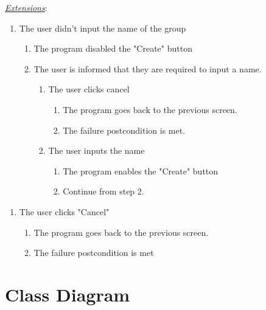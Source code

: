 \documentclass[a4paper]{article}
\begin{document}
\underline{\textit{Extensions}}:
\begin{enumerate}[label=1\alph*, leftmargin = 3em]
    \item The user didn't input the name of the group \begin{enumerate}[label=\arabic*.]
        \item The program disabled the "Create" button
        \item The user is informed that they are required to input a name.
        \begin{enumerate}[label=\alph*]
            \item The user clicks cancel \begin{enumerate}[label=\arabic*.]
                \item The program goes back to the previous screen.
                \item The failure postcondition is met.
            \end{enumerate}
            \item The user inputs the name \begin{enumerate}[label=\arabic*.]
                \item The program enables the "Create" button
                \item Continue from step 2. 
            \end{enumerate}
        \end{enumerate}
    \end{enumerate}
\end{enumerate}

\begin{enumerate}[label=4\alph*, leftmargin = 3em]
    \item The user clicks "Cancel" \begin{enumerate}[label=\arabic*.]
    \item The program goes back to the previous screen.
        \item The failure postcondition is met 
    \end{enumerate}
\end{enumerate}

\clearpage
\section{Class Diagram}
\end{document}
